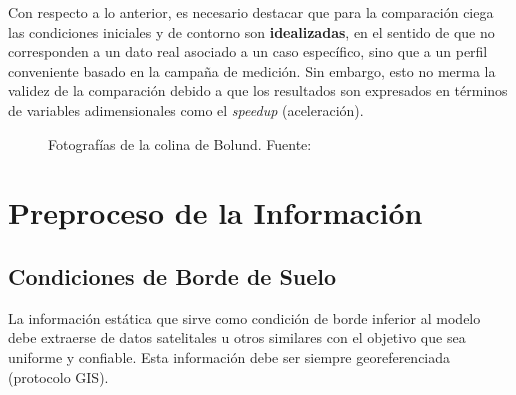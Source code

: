 Con respecto a lo anterior, es necesario destacar que para la comparación ciega las condiciones iniciales y de contorno  son \textbf{idealizadas}, en el sentido de que no corresponden a un dato real asociado a un caso específico, sino que a un perfil conveniente basado en la campaña de medición. Sin embargo, esto no merma la validez de la comparación debido a que los resultados son expresados en términos de variables adimensionales como el \emph{speedup} (aceleración).

\begin{figure}[H]
	\centering{}%
	\caption{Fotografías de la colina de Bolund. Fuente: \cite{phdthesis}}
	\label{fig:05_terreno_bolund}
\end{figure}

\newpage
\section{Preproceso de la Información}
\subsection{Condiciones de Borde de Suelo}
La información estática que sirve como condición de borde inferior al modelo debe extraerse de datos satelitales u otros similares con el objetivo que sea uniforme y confiable. Esta información debe ser siempre georeferenciada (protocolo GIS).

